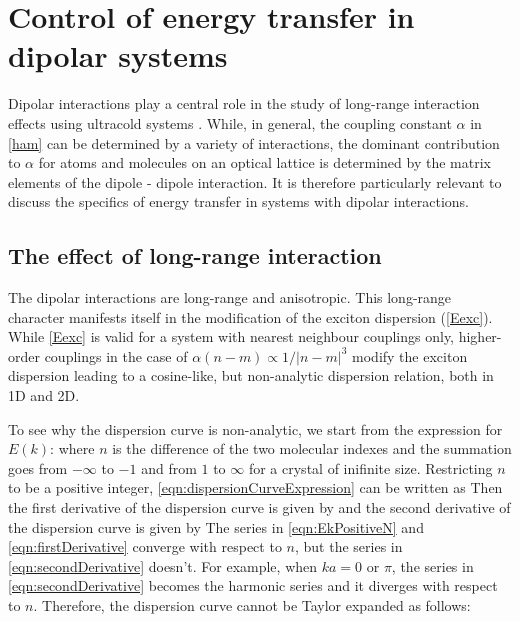 \section{Control of energy transfer in dipolar systems}
\label{sec:controlEnergyTransfer}

Dipolar interactions play a central role in the study of long-range interaction effects using ultracold systems \cite{our-njp-review}.
While, in general, the coupling constant $\alpha$ in \autoref{ham} can be determined by a variety of interactions, the dominant contribution to $\alpha$ for atoms and molecules on an optical lattice is determined by the matrix elements of the dipole - dipole interaction. It is therefore particularly relevant to discuss the specifics of energy transfer in systems with dipolar interactions. 

\subsection{The effect of long-range interaction}
\label{sec:long-rangeInteraction}

The dipolar interactions are long-range and anisotropic. This long-range character
manifests itself in the modification of the exciton dispersion (\ref{Eexc}). While \autoref{Eexc} is valid for a system 
with nearest neighbour couplings only, higher-order couplings in the case of $\alpha(n-m) \propto 1/ |n-m|^3$ 
modify the exciton dispersion leading to a cosine-like, 
but non-analytic dispersion relation, both in 1D  and 2D. 

To see why the dispersion curve is non-analytic, we start from the expression for $E(k)$:
where $n$ is the difference of the two molecular indexes and the summation goes from $-\infty$ to $-1$ and from
$1$ to $\infty$ for a crystal of inifinite size. Restricting $n$ to be a positive integer,
\autoref{eqn:dispersionCurveExpression} can be written as
Then the first derivative of the dispersion curve is given by
and the second derivative of the dispersion curve is given by
The series in \autoref{eqn:EkPositiveN} and \autoref{eqn:firstDerivative} converge with respect to $n$, but the 
series in \autoref{eqn:secondDerivative} doesn't. 
For example, when $k a = 0$ or $\pi$, the series in \autoref{eqn:secondDerivative} becomes the harmonic series and
 it diverges with respect to $n$. 
Therefore, the dispersion curve cannot be Taylor expanded as follows:


